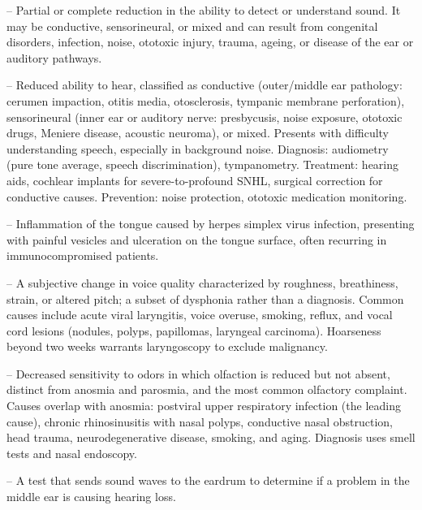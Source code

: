 -- Partial or complete reduction in the ability to detect or understand sound. It may be conductive, sensorineural, or mixed and can result from congenital disorders, infection, noise, ototoxic injury, trauma, ageing, or disease of the ear or auditory pathways.

-- Reduced ability to hear, classified as conductive (outer/middle ear pathology: cerumen impaction, otitis media, otosclerosis, tympanic membrane perforation), sensorineural (inner ear or auditory nerve: presbycusis, noise exposure, ototoxic drugs, Meniere disease, acoustic neuroma), or mixed. Presents with difficulty understanding speech, especially in background noise. Diagnosis: audiometry (pure tone average, speech discrimination), tympanometry. Treatment: hearing aids, cochlear implants for severe-to-profound SNHL, surgical correction for conductive causes. Prevention: noise protection, ototoxic medication monitoring.

-- Inflammation of the tongue caused by herpes simplex virus infection, presenting with painful vesicles and ulceration on the tongue surface, often recurring in immunocompromised patients.

-- A subjective change in voice quality characterized by roughness, breathiness, strain, or altered pitch; a subset of dysphonia rather than a diagnosis. Common causes include acute viral laryngitis, voice overuse, smoking, reflux, and vocal cord lesions (nodules, polyps, papillomas, laryngeal carcinoma). Hoarseness beyond two weeks warrants laryngoscopy to exclude malignancy.

-- Decreased sensitivity to odors in which olfaction is reduced but not absent, distinct from anosmia and parosmia, and the most common olfactory complaint. Causes overlap with anosmia: postviral upper respiratory infection (the leading cause), chronic rhinosinusitis with nasal polyps, conductive nasal obstruction, head trauma, neurodegenerative disease, smoking, and aging. Diagnosis uses smell tests and nasal endoscopy.

-- A test that sends sound waves to the eardrum to determine if a problem in the middle ear is causing hearing loss.

